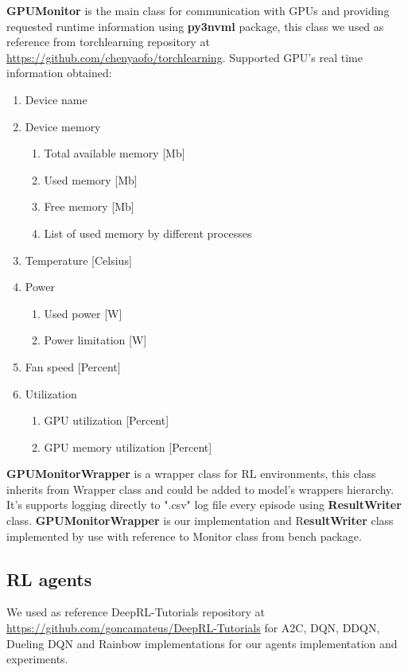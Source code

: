 \documentclass[11 pt, twocolumn]{article}
\begin{document}
\textbf{GPUMonitor} is the main class for communication with GPUs and providing requested runtime information using \textbf{py3nvml} package, this class we used as reference from
torchlearning repository at  \url{https://github.com/chenyaofo/torchlearning}.
Supported GPU's real time information obtained:
\begin{enumerate}
\item Device name
\item Device memory
\begin{enumerate}
\item Total available memory [Mb]
\item Used memory [Mb]
\item Free memory [Mb]
\item List of used memory by different processes
\end{enumerate}
\item Temperature [Celsius]
\item Power
\begin{enumerate}
\item Used power [W]
\item Power limitation [W]
\end{enumerate}
\item Fan speed [Percent]
\item Utilization
\begin{enumerate}
\item GPU utilization [Percent]
\item GPU memory utilization [Percent]
\end{enumerate}
\end{enumerate}


\textbf{GPUMonitorWrapper} is a wrapper class for RL environments, this class inherits from Wrapper class and could be added to model's wrappers hierarchy. It's supports logging directly to ".csv" log file every episode using \textbf{ResultWriter} class. \textbf{GPUMonitorWrapper} is our implementation and R\textbf{esultWriter} class implemented by use with reference to Monitor class from bench package.

\subsection{RL agents}
We used as reference DeepRL-Tutorials repository at \url{https://github.com/goncamateus/DeepRL-Tutorials} for A2C, DQN, DDQN, Dueling DQN and Rainbow implementations for our agents implementation and experiments.
\end{document}
